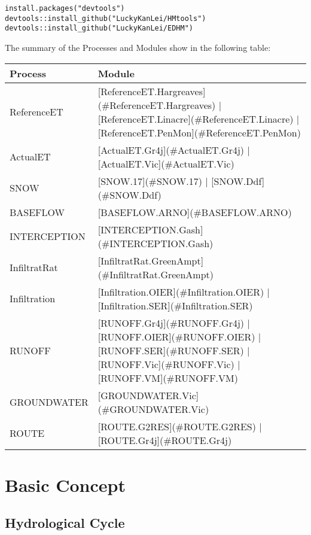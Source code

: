 \documentclass[
]{book}
\begin{document}
\begin{verbatim}
install.packages("devtools")
devtools::install_github("LuckyKanLei/HMtools")
devtools::install_github("LuckyKanLei/EDHM")
\end{verbatim}

The summary of the Processes and Modules show in the following table:

\begin{table}[!h]
\centering
\begin{tabular}{l|l}
\hline
Process & Module\\
\hline
ReferenceET & [ReferenceET.Hargreaves](\#ReferenceET.Hargreaves) | [ReferenceET.Linacre](\#ReferenceET.Linacre) | [ReferenceET.PenMon](\#ReferenceET.PenMon)\\
\cline{1-2}
ActualET & [ActualET.Gr4j](\#ActualET.Gr4j) | [ActualET.Vic](\#ActualET.Vic)\\
\cline{1-2}
SNOW & [SNOW.17](\#SNOW.17) | [SNOW.Ddf](\#SNOW.Ddf)\\
\cline{1-2}
BASEFLOW & [BASEFLOW.ARNO](\#BASEFLOW.ARNO)\\
\cline{1-2}
INTERCEPTION & [INTERCEPTION.Gash](\#INTERCEPTION.Gash)\\
\cline{1-2}
InfiltratRat & [InfiltratRat.GreenAmpt](\#InfiltratRat.GreenAmpt)\\
\cline{1-2}
Infiltration & [Infiltration.OIER](\#Infiltration.OIER) | [Infiltration.SER](\#Infiltration.SER)\\
\cline{1-2}
RUNOFF & [RUNOFF.Gr4j](\#RUNOFF.Gr4j) | [RUNOFF.OIER](\#RUNOFF.OIER) | [RUNOFF.SER](\#RUNOFF.SER) | [RUNOFF.Vic](\#RUNOFF.Vic) | [RUNOFF.VM](\#RUNOFF.VM)\\
\cline{1-2}
GROUNDWATER & [GROUNDWATER.Vic](\#GROUNDWATER.Vic)\\
\cline{1-2}
ROUTE & [ROUTE.G2RES](\#ROUTE.G2RES) | [ROUTE.Gr4j](\#ROUTE.Gr4j)\\
\hline
\end{tabular}
\end{table}

\hypertarget{base}{%
\chapter{Basic Concept}\label{base}}

\hypertarget{hydrological-cycle}{%
\section{Hydrological Cycle}\label{hydrological-cycle}}
\end{document}
